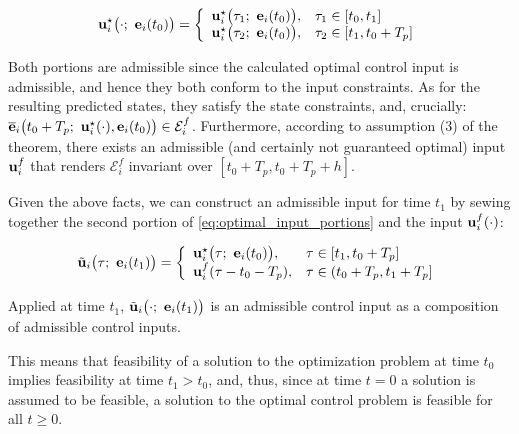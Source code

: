 \begin{equation}
  \bm{\mathbf{u}}_i^{\star}\big(\cdot;\ \bm{\mathbf{e}}_i(t_0)\big) = \left\{ \\
      \begin{array}{ll}
        \bm{\mathbf{u}}_i^{\star}\big(\tau_1;\ \bm{\mathbf{e}}_i(t_0)\big), & \tau_1 \in [t_0, t_1] \\
        \bm{\mathbf{u}}_i^{\star}\big(\tau_2;\ \bm{\mathbf{e}}_i(t_0)\big), & \tau_2 \in [t_1, t_0 + T_p]
      \end{array}
      \right.
  \label{eq:optimal_input_portions}
\end{equation}

Both portions are admissible since the calculated optimal control input is
admissible, and hence they both conform to the input constraints.
As for the resulting predicted states, they satisfy the state constraints, and,
crucially: $\overline{\bm{\mathbf{e}}}_i\big(t_0 + T_p;\ \bm{\mathbf{u}}_i^{\star}(\cdot), \bm{\mathbf{e}}_i(t_0)\big) \in \mathcal{E}_i^f$.
Furthermore, according to assumption (3) of the theorem, there exists an
admissible (and certainly not guaranteed optimal) input $\bm{\mathbf{u}}_i^f$ that
renders $\mathcal{E}_i^f$ invariant over $[t_0 + T_p, t_0 + T_p + h]$.

Given the above facts, we can construct an admissible input for time $t_1$
by sewing together the second portion of \eqref{eq:optimal_input_portions}
and the input $\bm{\mathbf{u}}_i^f(\cdot)$:

\begin{equation}
  \tilde{\bm{\mathbf{u}}}_i\big(\tau;\ \bm{\mathbf{e}}_i(t_1)\big) = \left\{ \\
      \begin{array}{ll}
        \bm{\mathbf{u}}_i^{\star}\big(\tau;\ \bm{\mathbf{e}}_i(t_0)\big), & \tau \in [t_1, t_0 + T_p] \\
        \bm{\mathbf{u}}_i^f(\tau - t_0 - T_p), & \tau \in (t_0 + T_p, t_1 + T_p]
      \end{array}
      \right.
\label{eq:optimal_input_t_plus_one}
\end{equation}

Applied at time $t_1$, $\tilde{\bm{\mathbf{u}}}_i\big(\cdot;\ \bm{\mathbf{e}}_i(t_1)\big)$
is an admissible control input as a composition of admissible control inputs.

This means that feasibility of a solution to the optimization problem at time
$t_0$ implies feasibility at time $t_1 > t_0$, and, thus, since at time $t=0$
a solution is assumed to be feasible, a solution to the optimal control problem
is feasible for all $t \geq 0$.\\

